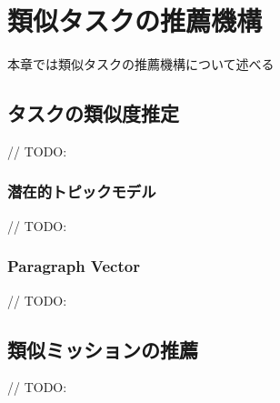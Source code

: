 \chapter{類似タスクの推薦機構}
本章では類似タスクの推薦機構について述べる

\section{タスクの類似度推定}
// TODO:

\subsection{潜在的トピックモデル}
// TODO:

\subsection{Paragraph Vector}
// TODO:

\section{類似ミッションの推薦}
// TODO:
